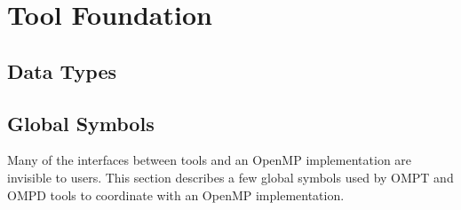 \section{Tool Foundation}
\subsection{Data Types}



\subsection{Global Symbols}
Many of the interfaces between tools and an OpenMP implementation are invisible to users. This section describes
a few global symbols used by OMPT and OMPD tools to coordinate with an OpenMP implementation.

